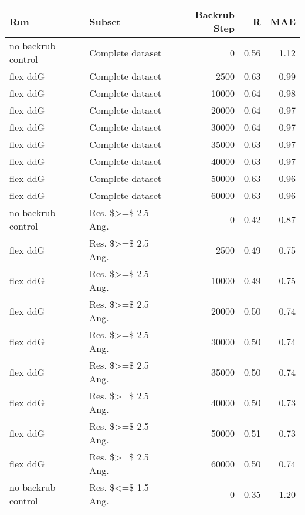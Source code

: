 \begin{table}
\begin{tabular}{llrrr}
\toprule
                Run &                          Subset &  Backrub Step &    R &  MAE \\
\midrule
 no backrub control &                Complete dataset &             0 & 0.56 & 1.12 \\
           flex ddG &                Complete dataset &          2500 & 0.63 & 0.99 \\
           flex ddG &                Complete dataset &         10000 & 0.64 & 0.98 \\
           flex ddG &                Complete dataset &         20000 & 0.64 & 0.97 \\
           flex ddG &                Complete dataset &         30000 & 0.64 & 0.97 \\
           flex ddG &                Complete dataset &         35000 & 0.63 & 0.97 \\
           flex ddG &                Complete dataset &         40000 & 0.63 & 0.97 \\
           flex ddG &                Complete dataset &         50000 & 0.63 & 0.96 \\
           flex ddG &                Complete dataset &         60000 & 0.63 & 0.96 \\
 no backrub control &              Res. \$>=\$ 2.5 Ang. &             0 & 0.42 & 0.87 \\
           flex ddG &              Res. \$>=\$ 2.5 Ang. &          2500 & 0.49 & 0.75 \\
           flex ddG &              Res. \$>=\$ 2.5 Ang. &         10000 & 0.49 & 0.75 \\
           flex ddG &              Res. \$>=\$ 2.5 Ang. &         20000 & 0.50 & 0.74 \\
           flex ddG &              Res. \$>=\$ 2.5 Ang. &         30000 & 0.50 & 0.74 \\
           flex ddG &              Res. \$>=\$ 2.5 Ang. &         35000 & 0.50 & 0.74 \\
           flex ddG &              Res. \$>=\$ 2.5 Ang. &         40000 & 0.50 & 0.73 \\
           flex ddG &              Res. \$>=\$ 2.5 Ang. &         50000 & 0.51 & 0.73 \\
           flex ddG &              Res. \$>=\$ 2.5 Ang. &         60000 & 0.50 & 0.74 \\
 no backrub control &              Res. \$<=\$ 1.5 Ang. &             0 & 0.35 & 1.20 \\

\end{tabular}
\end{table}
